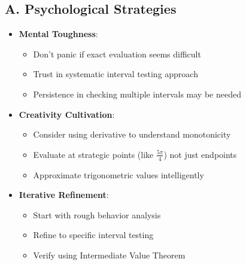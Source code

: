 \documentclass[]{article}
\begin{document}
\begin{strategicbox}
\subsection*{A. Psychological Strategies}
\begin{itemize}[leftmargin=*]
    \item \textbf{Mental Toughness}: 
    \begin{itemize}
        \item Don't panic if exact evaluation seems difficult
        \item Trust in systematic interval testing approach
        \item Persistence in checking multiple intervals may be needed
    \end{itemize}
    \item \textbf{Creativity Cultivation}: 
    \begin{itemize}
        \item Consider using derivative to understand monotonicity
        \item Evaluate at strategic points (like $\frac{5\pi}{4}$) not just endpoints
        \item Approximate trigonometric values intelligently
    \end{itemize}
    \item \textbf{Iterative Refinement}: 
    \begin{itemize}
        \item Start with rough behavior analysis
        \item Refine to specific interval testing
        \item Verify using Intermediate Value Theorem
    \end{itemize}
\end{itemize}


\end{strategicbox}
\end{document}
